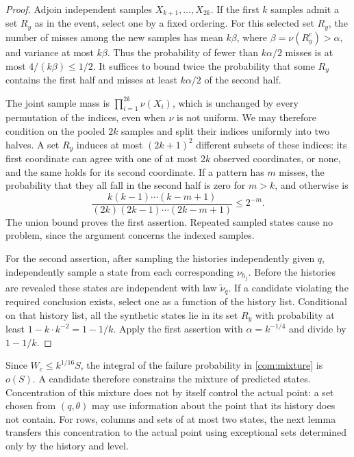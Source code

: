 \begin{proof}
Adjoin independent samples \(X_{k+1},\ldots,X_{2k}\). If the first \(k\)
samples admit a set \(R_y\) as in the event, select one by a fixed ordering. For this
selected set \(R_y\), the number of misses among the new samples has mean
\(k\beta\), where \(\beta=\nu(R_y^c)>\alpha\), and variance at most
\(k\beta\). Thus the probability of fewer than \(k\alpha/2\) misses is at
most \(4/(k\beta)\le1/2\). It suffices to bound twice the probability that
some \(R_y\) contains the first half and misses at least \(k\alpha/2\) of the
second half.

The joint sample mass is \(\prod_{i=1}^{2k}\nu(X_i)\), which is unchanged
by every permutation of the indices, even when \(\nu\) is not uniform.
We may therefore condition on the pooled \(2k\) samples and split their
indices uniformly into two halves. A set \(R_y\) induces at most \((2k+1)^2\) different subsets of these
indices: its first coordinate can agree with one of at most \(2k\) observed
coordinates, or none, and the same holds for its second coordinate. If a
pattern has \(m\) misses, the probability that they all fall in the second
half is zero for \(m>k\), and otherwise is
\[
 \frac{k(k-1)\cdots(k-m+1)}{(2k)(2k-1)\cdots(2k-m+1)}
 \le 2^{-m}.
\]
The union bound proves the first assertion. Repeated sampled states cause no
problem, since the argument concerns the indexed samples.

For the second assertion, after sampling the histories independently given
\(q\), independently sample a state from each corresponding \(\nu_{h_j}\).
Before the histories are revealed these states are independent with law
\(\widetilde\nu_q\). If a candidate violating the required conclusion exists,
select one as a function of the history list. Conditional on that history list, all
the synthetic states lie in its set \(R_y\) with probability at least
\(1-k\cdot k^{-2}=1-1/k\). Apply the first assertion with
\(\alpha=k^{-1/4}\) and divide by \(1-1/k\).
\end{proof}

Since \(W_c\le k^{1/16}S\), the integral of the failure probability in
\eqref{com:mixture} is \(o(S)\). A candidate therefore constrains the mixture
of predicted states. Concentration of this mixture does not by itself
control the actual point: a set chosen from \((q,\theta)\) may use
information about the point that its history does not contain.
For rows, columns and sets of at most two states, the next lemma
transfers this concentration to the actual point using exceptional sets
determined only by the history and level.

